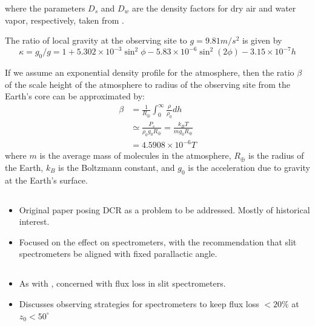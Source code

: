 \documentclass[]{article}
\begin{document}
where the parameters $D_s$ and $D_w$ are the density factors for dry air and water vapor, respectively, taken from \cite{Owens:67}.

The ratio of local gravity at the observing site to $g = 9.81 m/s^2$ is given by
\begin{equation}
\kappa = g_0/g = 1 + 5.302\times 10^{-3} \sin^2\phi - 5.83\times 10^{-6} \sin^2(2\phi) - 3.15\times 10^{-7} h \label{eqn:kappa}
\end{equation}

If we assume an exponential density profile for the atmosphere, then the ratio $\beta$ of the scale height of the atmosphere to radius of the observing site from the Earth's core can be approximated by:
\begin{align}
	\beta &= \frac{1}{R_\oplus}\int_{0}^\infty \frac{\rho}{\rho_0} dh \nonumber \\
	&\simeq \frac{P_s}{\rho_0g_0 R_\oplus} = \frac{k_BT}{m g_0 R_\oplus} \nonumber \\
	&=  4.5908\times 10^{-6} T \label{eqn:beta}
\end{align}
where $m$ is the average mass of molecules in the atmosphere, $R_\oplus$ is the radius of the Earth, $k_B$ is the Boltzmann constant, and $g_0$ is the acceleration due to gravity at the Earth's surface.



\subsection{\cite{Filippenko1982}}
\begin{itemize}
	\item Original paper posing DCR as a problem to be addressed. Mostly of historical interest.
	\item Focused on the effect on spectrometers, with the
	recommendation that slit spectrometers be aligned with fixed
	parallactic angle. 
\end{itemize}

\subsection{\cite{Cuby1998}}
\begin{itemize}
	\item As with \citeauthor{Filippenko1982}, concerned with flux loss in slit spectrometers. 
	\item Discusses observing strategies for spectrometers to keep flux loss $< 20\%$ at $z_0<50^\circ$
\end{itemize}


\end{document}
